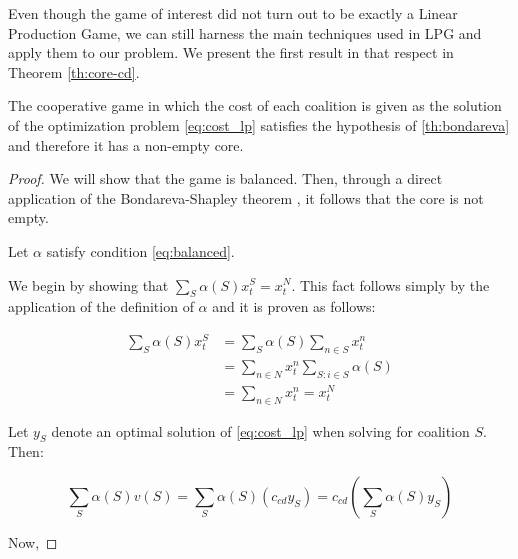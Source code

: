 \documentclass[sigconf, table]{acmart}
\newcommand{\ccd}{c_{cd}}
\begin{document}
Even though the game of interest did not turn out to be exactly a Linear Production Game, we can still harness the main techniques used in LPG and apply them to our problem. We present the first result in that respect in Theorem \ref{th:core-cd}.

\begin{theorem}\label{th:core-cd}
  The cooperative game in which the cost of each coalition is given as the solution of the optimization problem \eqref{eq:cost_lp} satisfies the hypothesis of \ref{th:bondareva} and therefore it has a non-empty core.
\end{theorem}

\begin{proof}
We will show that the game is balanced. Then, through a direct application of the Bondareva-Shapley theorem \cite{Shapley1971}, it follows that the core is not empty.


Let $\alpha$ satisfy condition \eqref{eq:balanced}.

We begin by showing that $ \sum_S \alpha(S) x^S_t = x^N_t$. This fact follows simply by the application of the definition of $\alpha$ and it is proven as follows:
 

\begin{equation}\label{eq:rhs_core_deter}
    \begin{aligned}
        \sum_S \alpha(S) x^S_t & = \sum_S \alpha(S) \sum_{n \in S}x^n_t \\ &= \sum_{n \in N}x^n_t\sum_{S \colon i \in S} \alpha(S) \\ &= \sum_{n \in N} x^n_t = x^N_t
    \end{aligned}
 \end{equation}

Let $y_S$ denote an optimal solution of \eqref{eq:cost_lp} when solving for coalition $S$. Then:

\begin{equation}
    \sum_{S} \alpha(S) v(S) = \sum_{S} \alpha(S) \left(\ccd y_S\right) = \ccd \left(\sum_S \alpha(S) y_S \right)
\end{equation}

Now,


\end{proof}
\end{document}
